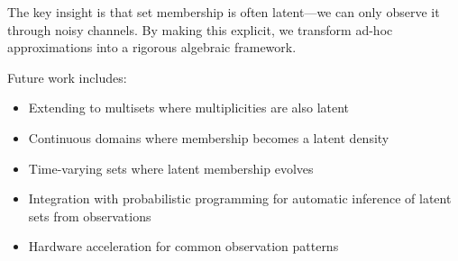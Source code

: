 \documentclass[11pt,final,hidelinks]{article}
\begin{document}
The key insight is that set membership is often latent—we can only observe it through noisy channels. By making this explicit, we transform ad-hoc approximations into a rigorous algebraic framework.

Future work includes:
\begin{itemize}
    \item Extending to multisets where multiplicities are also latent
    \item Continuous domains where membership becomes a latent density
    \item Time-varying sets where latent membership evolves
    \item Integration with probabilistic programming for automatic inference of latent sets from observations
    \item Hardware acceleration for common observation patterns
\end{itemize}


\end{document}
